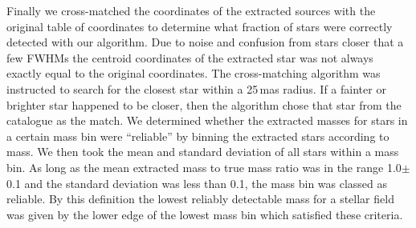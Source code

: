 Finally we cross-matched the coordinates of the extracted sources with the original table of coordinates to determine what fraction of stars were correctly detected with our algorithm. 
Due to noise and confusion from stars closer that a few FWHMs the centroid coordinates of the extracted star was not always exactly equal to the original coordinates. 
The cross-matching algorithm was instructed to search for the closest star within a 25\,mas radius. 
If a fainter or brighter star happened to be closer, then the algorithm chose that star from the catalogue as the match. 
We determined whether the extracted masses for stars in a certain mass bin were ``reliable'' by binning the extracted stars according to mass. 
We then took the mean and standard deviation of all stars within a mass bin. 
As long as the mean extracted mass to true mass ratio was in the range 1.0$\pm$0.1 and the standard deviation was less than 0.1, the mass bin was classed as reliable. 
By this definition the lowest reliably detectable mass for a stellar field was given by the lower edge of the lowest mass bin which satisfied these criteria.





































